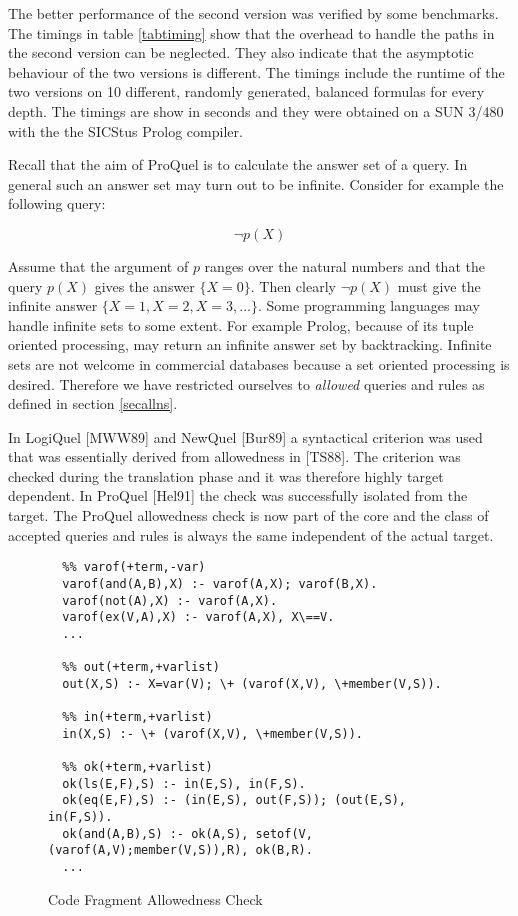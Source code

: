 The better performance of the second version was verified by some benchmarks. The timings in
table \ref{tabtiming} show that the overhead to handle the paths in the second version can be
neglected. They also indicate that the asymptotic behaviour of the two versions is different. 
The timings include the runtime of the two versions on 10 different, randomly generated, balanced 
formulas for every depth. The timings are show in seconds and they were obtained on a SUN 3/480 
with the the SICStus Prolog compiler.

\label{secallowc}
Recall that the aim of ProQuel is to calculate the answer set of a query. In general such an
answer set may turn out to be infinite. Consider for example the following query:

\begin{displaymath}
\neg p(X)
\end{displaymath}

Assume that the argument of $p$ ranges over the natural numbers and that the query $p(X)$ gives 
the answer $\{X=0\}$. Then clearly $\neg p(X)$ must give the infinite answer $\{X=1,X=2,X=3,
\ldots\}$. Some programming languages may handle infinite sets to some extent. For example Prolog,
because of its tuple oriented processing, may return an infinite answer set by backtracking. 
Infinite sets are not welcome in commercial databases because a set oriented processing is
desired. Therefore we have restricted ourselves to {\em allowed} queries and rules as defined 
in section \ref{secallns}.

In LogiQuel [MWW89] and NewQuel [Bur89] a syntactical criterion was used that was essentially 
derived from allowedness in [TS88]. The criterion was checked during the translation phase and
it was therefore highly target dependent. In ProQuel [Hel91] the check was successfully isolated
from the target. The ProQuel allowedness check is now part of the core and the class of accepted 
queries and rules is always the same independent of the actual target.

\begin{figure}
{\small
\begin{verbatim}
  %% varof(+term,-var)
  varof(and(A,B),X) :- varof(A,X); varof(B,X).
  varof(not(A),X) :- varof(A,X).
  varof(ex(V,A),X) :- varof(A,X), X\==V.
  ...

  %% out(+term,+varlist)
  out(X,S) :- X=var(V); \+ (varof(X,V), \+member(V,S)).

  %% in(+term,+varlist)
  in(X,S) :- \+ (varof(X,V), \+member(V,S)).

  %% ok(+term,+varlist)
  ok(ls(E,F),S) :- in(E,S), in(F,S).
  ok(eq(E,F),S) :- (in(E,S), out(F,S)); (out(E,S), in(F,S)).
  ok(and(A,B),S) :- ok(A,S), setof(V,(varof(A,V);member(V,S)),R), ok(B,R).
  ...
\end{verbatim}
}
\caption{Code Fragment Allowedness Check}
\label{figallow}
\end{figure}

